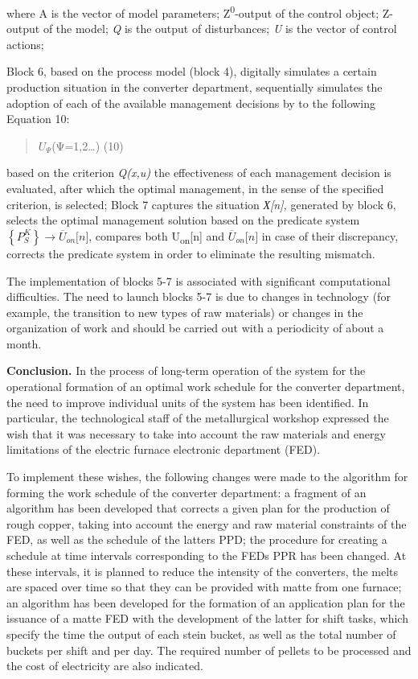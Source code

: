 where A is the vector of model parameters; Z\textsuperscript{0}-output
of the control object; Z- output of the model; \emph{Q} is the output of
disturbances; \emph{U} is the vector of control actions;

Block 6, based on the process model (block 4), digitally simulates a
certain production situation in the converter department, sequentially
simulates the adoption of each of the available management decisions by
to the following Equation 10:

\begin{quote}
\(U_{\Psi}\)(Ψ=1,2\ldots) (10)
\end{quote}

based on the criterion \emph{Q(x,u)} the effectiveness of each
management decision is evaluated, after which the optimal management, in
the sense of the specified criterion, is selected; Block 7 captures the
situation \emph{Х{[}n{]},} generated by block 6, selects the optimal
management solution based on the predicate system
\(\left\{ P_{S}^{K} \right\} \rightarrow {\overline{U}}_{on}\lbrack n\rbrack\),
compares both U\textsubscript{on}{[}n{]} and
\({\overline{U}}_{on}\lbrack n\rbrack\) in case of their discrepancy,
corrects the predicate system in order to eliminate the resulting
mismatch.

The implementation of blocks 5-7 is associated with significant
computational difficulties. The need to launch blocks 5-7 is due to
changes in technology (for example, the transition to new types of raw
materials) or changes in the organization of work and should be carried
out with a periodicity of about a month.

\textbf{Conclusion.} In the process of long-term operation of the system
for the operational formation of an optimal work schedule for the
converter department, the need to improve individual units of the system
has been identified. In particular, the technological staff of the
metallurgical workshop expressed the wish that it was necessary to take
into account the raw materials and energy limitations of the electric
furnace electronic department (FED).

To implement these wishes, the following changes were made to the
algorithm for forming the work schedule of the converter department: a
fragment of an algorithm has been developed that corrects a given plan
for the production of rough copper, taking into account the energy and
raw material constraints of the FED, as well as the schedule of the
latter\textquotesingle s PPD; the procedure for creating a schedule at
time intervals corresponding to the FED\textquotesingle s PPR has been
changed. At these intervals, it is planned to reduce the intensity of
the converters, the melts are spaced over time so that they can be
provided with matte from one furnace; an algorithm has been developed
for the formation of an application plan for the issuance of a matte FED
with the development of the latter for shift tasks, which specify the
time the output of each stein bucket, as well as the total number of
buckets per shift and per day. The required number of pellets to be
processed and the cost of electricity are also indicated.

